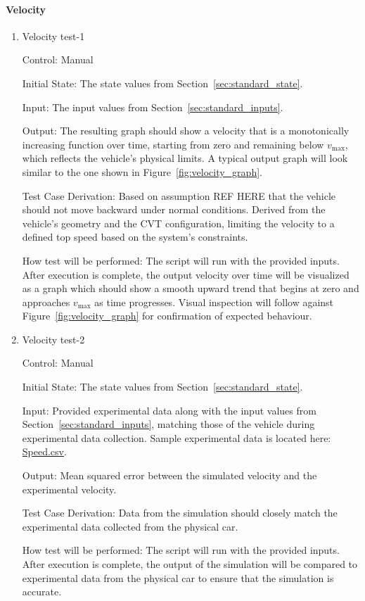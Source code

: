 \documentclass[12pt, titlepage]{article}
\begin{document}
\paragraph{Velocity}

\begin{enumerate}

\item{Velocity test-1\\}

Control: Manual
					
Initial State: The state values from Section~\ref{sec:standard_state}.

Input: The input values from Section~\ref{sec:standard_inputs}.
					
Output: The resulting graph should show a velocity that is a monotonically increasing function over time, starting from zero and remaining below $v_\text{max}$, which reflects the vehicle’s physical limits. A typical output graph will look similar to the one shown in Figure~\ref{fig:velocity_graph}.

Test Case Derivation: Based on assumption REF HERE that the vehicle should not move backward under normal conditions.
Derived from the vehicle’s geometry and the CVT configuration, limiting the velocity to a defined top speed based on the system’s constraints.


How test will be performed: The script will run with the provided inputs. After execution is complete, the output velocity over time will be visualized as a graph which should show a smooth upward trend that begins at zero and approaches $v_\text{max}$ as time progresses. Visual inspection will follow against Figure~\ref{fig:velocity_graph} for confirmation of expected behaviour.
					
\item{Velocity test-2\\}

Control: Manual

Initial State: The state values from Section~\ref{sec:standard_state}.

Input: Provided experimental data along with the input values from Section~\ref{sec:standard_inputs}, matching those of the vehicle during experimental data collection. Sample experimental data is located here: \href{https://github.com/gr812b/CVT-Simulator/experimental-data/GPS%20SPEED.csv}{Speed.csv}.

Output: Mean squared error between the simulated velocity and the experimental velocity.

Test Case Derivation: Data from the simulation should closely match the experimental data collected from the physical car.

How test will be performed: The script will run with the provided inputs. After execution is complete, the output of the simulation will be compared to experimental data from the physical car to ensure that the simulation is accurate.

\end{enumerate}
\end{document}
